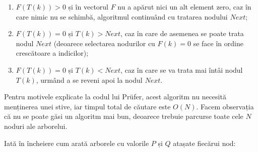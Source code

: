 \begin{enumerate}

\item $F(T(k))>0$ și în vectorul $F$ nu a apărut nici un alt element zero, caz
  în care nimic nu se schimbă, algoritmul continuând cu tratarea nodului
  $Next$;

\item $F(T(k))=0$ și $T(k)>Next$, caz în care de asemenea se poate trata nodul
  $Next$ (deoarece selectarea nodurilor cu $F(k)=0$ se face în ordine
  crescătoare a indicilor);

\item $F(T(k))=0$ și $T(k)<Next$, caz în care se va trata mai întâi nodul
  $T(k)$, urmând a se reveni apoi la nodul $Next$.

\end{enumerate}

Pentru motivele explicate la codul lui Prüfer, acest algoritm nu necesită
menținerea unei stive, iar timpul total de căutare este $O(N)$. Facem
observația că nu se poate găsi un algoritm mai bun, deoarece trebuie parcurse
toate cele $N$ noduri ale arborelui.

Iată în încheiere cum arată arborele cu valorile $P$ și $Q$ atașate fiecărui
nod:



